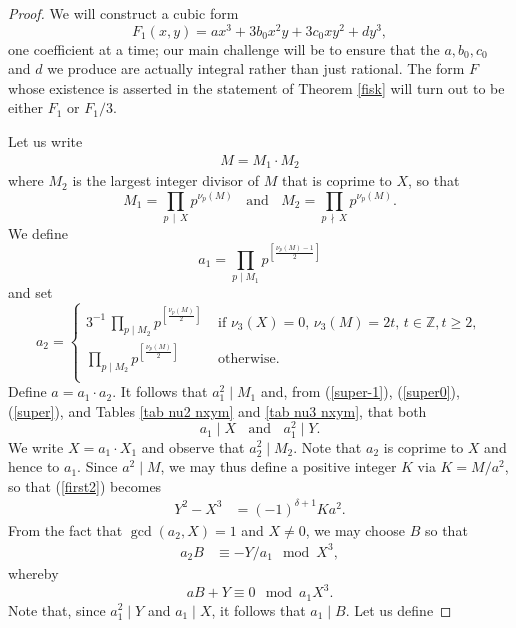 \documentclass[11pt]{report}
\theoremstyle{definition}
\begin{document}
\begin{proof}
We will construct a cubic form
$$
 F_1(x,y) = ax^3 + 3b_0 x^2y + 3c_0 xy^2 + dy^3,
$$
one coefficient at a time; our main challenge will be to ensure that the $a, b_0, c_0$ and $d$ we produce are actually integral rather than just rational. The form $F$ whose existence is asserted
in the statement of Theorem \ref{fisk} will turn out to be either $F_1$ or $F_1/3$.

Let us write
\begin{align*}
  M = M_1 \cdot M_2
\end{align*}
where $M_2$ is the largest integer divisor of $M$ that is coprime to $X$, so that
$$
M_1 = \prod_{p \, \mid  \, X} p^{\nu_p (M)} \; \; \mbox{ and } \; \;  M_2 = \prod_{p \, \nmid \, X} p^{\nu_p (M)}.
$$
We define
\begin{equation} \label{a1}
a_1 = \prod_{p \mid M_1} p^{\left[ \frac{\nu_p (M)-1}{2} \right]}
\end{equation}
and set
\begin{equation} \label{a2}
a_2 = \left\{
\begin{array}{cl}
3^{-1} \, \prod_{p \mid M_2} p^{\left[ \frac{\nu_p (M)}{2} \right]} & \mbox{ if }  \nu_3 (X)=0, \, \nu_3(M) =2t, \, t \in \mathbb{Z}, t \geq 2,  \\
\prod_{p \mid M_2} p^{\left[ \frac{\nu_p (M)}{2} \right]} & \mbox{ otherwise. } \\
\end{array}
\right.
\end{equation}
Define $a = a_1 \cdot a_2$.
It follows that $a_1^2 \mid M_1$ and, from (\ref{super-1}), (\ref{super0}), (\ref{super}), and Tables \ref{tab nu2 nxym} and \ref{tab nu3 nxym}, that both
$$
a_1 \mid X \; \; \mbox{ and } \; \;  a_1^2 \mid Y.
$$
We write $X = a_1 \cdot X_1$ and observe that $a_2^2 \mid M_2$. Note that $a_2$ is coprime to $X$ and hence to $a_1$.
Since $a^2 \mid M$, we may thus define a positive integer $K$ via $K = M/a^2$, so that (\ref{first2}) becomes
\begin{align*}
Y^2-X^3 &= (-1)^{\delta+1} Ka^2.
\end{align*}
From the fact that $\gcd (a_2,X)=1$ and $X \neq 0$, we may choose $B$ so that
\begin{align*}
  a_2 B &\equiv -Y/a_1 \mod{X^3},
\end{align*}
whereby
\begin {equation} \label{truth}
a B+Y \equiv 0 \mod{a_1X^3}.
\end{equation}
Note that, since $a_1^2 \mid Y$ and $a_1 \mid X$, it follows that $a_1 \mid B$.
Let us define

\end{proof}
\end{document}
